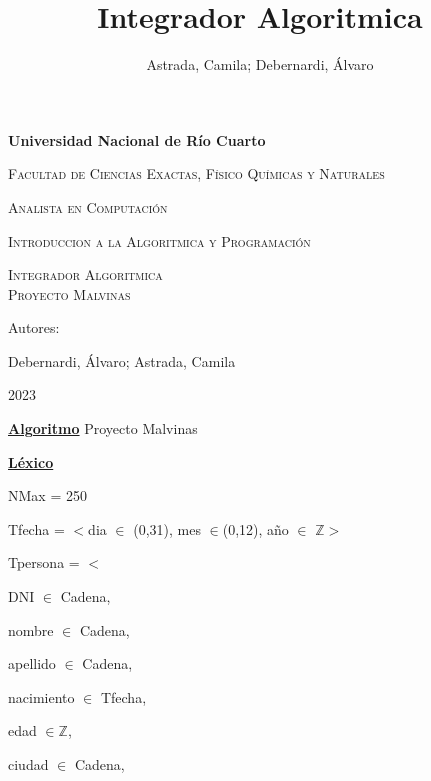 \documentclass{article}
\title{Integrador Algoritmica}
\author{Astrada, Camila; Debernardi, Álvaro}
\begin{document}
    \begin{titlepage}
        \centering
        {\bfseries\LARGE Universidad Nacional de Río Cuarto \par}
        \vspace{1cm}
        {\scshape\Large Facultad de Ciencias Exactas, Físico Químicas y Naturales \par}
        {\scshape\Large Analista en Computación \par}
        {\scshape\Large Introduccion a la Algoritmica y Programación\par}
        \vspace{3cm}
        {\scshape\Huge Integrador Algoritmica \\ Proyecto Malvinas\par}
        \vspace{3cm}
        \vfill
        {\Large Autores: \par}
        {\Large Debernardi, Álvaro; Astrada, Camila\par}
        \vfill
        {\Large 2023 \par} 
    \end{titlepage}

    \underline{\textbf{Algoritmo}} Proyecto Malvinas

    \underline{\textbf{Léxico}}

    \hspace{4mm}NMax = 250

    \hspace{4mm}Tfecha = $<$dia $\in$ (0,31), mes $\in$(0,12), año $\in$ $\mathbb{Z}>$

    \hspace{4mm}Tpersona = $<$
    
        \hspace{8mm}DNI $\in$ Cadena, 
        
        \hspace{8mm}nombre $\in$ Cadena, 
        
        \hspace{8mm}apellido $\in$ Cadena, 
        
        \hspace{8mm}nacimiento $\in$ Tfecha, 
        
        \hspace{8mm}edad $\in \mathbb{Z}$, 
        
        \hspace{8mm}ciudad $\in$ Cadena, 
\end{document}
